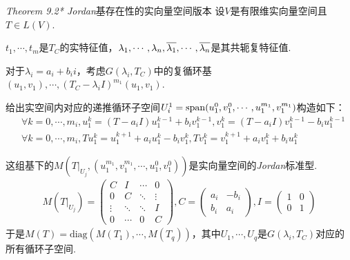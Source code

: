 \newpage

\textit{Theorem 9.2* Jordan}{\kaishu 基存在性的实向量空间版本}
设\(V\)是有限维实向量空间且\(T \in L(V)\).

\(t_1,\cdots,t_m\)是\(T_C\)的实特征值，\(\lambda_1,\cdots,\lambda_n,\overline{\lambda_1},\cdots,\overline{\lambda_n}\)是其共轭复特征值.

对于\(\lambda_i=a_i+b_i i\)，考虑\(G(\lambda_i,T_C)\)中的复循环基\((u_1,v_1),\cdots,(T_C-\lambda_i I)^{m_1}(u_1,v_1)\).

给出实空间内对应的递推循环子空间\(U_i^1=\mathrm{span}(u_1^0,v_1^0,\cdots,u_1^{m_1},v_1^{m_1})\)构造如下：
    \begin{align*}
        &\forall k=0,\cdots,m_i,u_1^k=(T-a_iI)u_1^{k-1}+b_i v_1^{k-1},v_1^k=(T-a_iI)v_1^{k-1}-b_i u_1^{k-1} \\
        &\forall k=0,\cdots,m_i,Tu_1^k=u_1^{k+1}+a_i u_1^k-b_i v_1^k,Tv_1^k=v_1^{k+1}+a_i v_1^k+b_i u_1^k
    \end{align*}

这组基下的\(M(T|_{U_j},(u_1^{m_1},v_1^{m_1},\cdots,u_1^0,v_1^0))\)是实向量空间的\textit{Jordan}标准型.
    \begin{align*}
        M(T|_{U_j})=
        \begin{pmatrix}
            C      & I       & \cdots & 0      \\
            0      & C       & \ddots & \vdots \\
            \vdots & \ddots  & \ddots & I      \\
            0      & \cdots  & 0      & C
        \end{pmatrix}
        ,C=
        \begin{pmatrix}
            a_i & -b_i \\
            b_i & a_i
        \end{pmatrix}
        ,I=
        \begin{pmatrix}
            1 & 0 \\
            0 & 1
        \end{pmatrix}
    \end{align*}
于是\(M(T)=\mathrm{diag}(M(T_1),\cdots,M(T_q))\)，其中\(U_1,\cdots,U_q\)是\(G(\lambda_i,T_C)\)对应的所有循环子空间.

